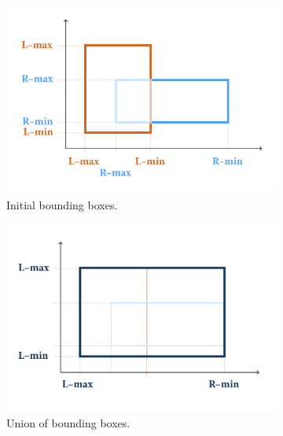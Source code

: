 \documentclass[a4paper,11pt,oneside]{article}
\begin{document}
\begin{figure}[ht]
	\centering
     \begin{subfigure}[b]{0.4\textwidth}
         \centering
         \includegraphics[width=\linewidth]{section4/4.2/box-enclosure-initial.png}
         \caption{Initial bounding boxes.}
         \label{sec4.2:composite-box-base}
     \end{subfigure}
     \hfill
     \begin{subfigure}[b]{0.4\textwidth}
         \centering
         \includegraphics[width=\linewidth]{section4/4.2/box-enclosure-union.png}
         \caption{Union of bounding boxes.}
         \label{sec4.2:composite-box-union}
     \end{subfigure}
     \medskip
     \begin{subfigure}[b]{0.4\textwidth}
         \centering

\end{subfigure}
\end{figure}
\end{document}
